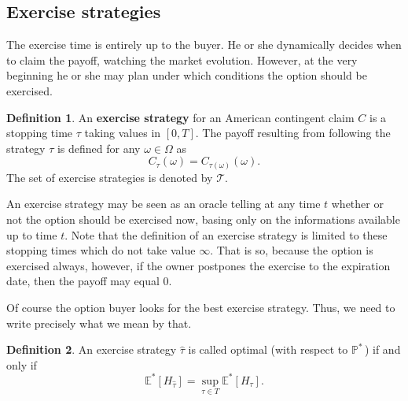 \documentclass[a4paper,11pt, twoside]{book}
\theoremstyle{definition}
\newtheorem{mydef}{Definition}[chapter]
\theoremstyle{remark}
\def\Em{{\mathbb{E}^*}}
\def\Pm{{\mathbb{P}}^*\,}
\begin{document}
\subsection{Exercise strategies}
The exercise time is entirely up to the buyer. He or she dynamically decides when to claim the payoff, watching the market evolution. However, at the very beginning he or she may plan under which conditions the option should be exercised.
\begin{mydef}
 An \textbf{exercise strategy} for an American contingent claim $C$ is a stopping time $\tau$ taking values in $[0,T]$. The payoff resulting from following the strategy $\tau$ is defined for any $\omega \in \Omega$ as
 \[ C_{\tau}(\omega) = C_{\tau(\omega)}(\omega).\]
 The set of exercise strategies is denoted by $\mathcal{T}$. 
\end{mydef}
An exercise strategy may be seen as an oracle telling at any time $t$ whether or not the option should be exercised now, basing only on the informations available up to time $t$. Note that the definition of an exercise strategy is limited to these stopping times which do not take value $\infty$. That is so, because the option is exercised always, however, if the owner postpones the exercise to the expiration date, then the payoff may equal 0.

Of course the option buyer looks for the best exercise strategy. Thus, we need to write precisely what we mean by that.
\begin{mydef}
 An exercise strategy $\hat{\tau}$ is called optimal (with respect to $\Pm$) if and only if
\begin{equation}
\label{eq:AM_optStrategy}
\Em[H_{\hat{\tau}}] = \sup\limits_{\tau \in T} \Em[H_{\tau}]. 
\end{equation}
\end{mydef}
\end{document}
